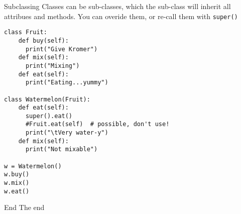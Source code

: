 \begin{frame}[containsverbatim]{Subclassing}
  Classes can be sub-classes, which the sub-class will inherit all attribues and methods. You can overide them, or re-call them with \verb|super()|

\begin{verbatim}
class Fruit:
    def buy(self):
      print("Give Kromer")
    def mix(self):
      print("Mixing")
    def eat(self):
      print("Eating...yummy")

class Watermelon(Fruit):
    def eat(self):
      super().eat()
      #Fruit.eat(self)  # possible, don't use!
      print("\tVery water-y")
    def mix(self):
      print("Not mixable")

w = Watermelon()
w.buy()
w.mix()
w.eat()
\end{verbatim}
\end{frame}

\begin{frame}[standout]{End}
  The end
\end{frame}


